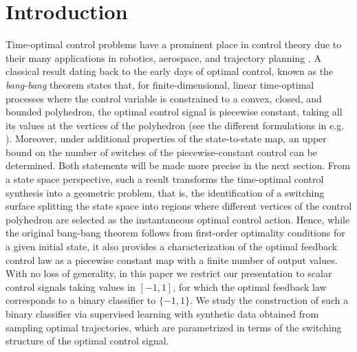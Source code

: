 \documentclass[11pt]{amsart}
\theoremstyle{definition}
\theoremstyle{remark}
\numberwithin{equation}{section}
\begin{document}
\section{Introduction}
Time-optimal control problems have a prominent place in control theory due to their many applications in robotics, aerospace, and trajectory planning \cite{TOCP,TOCR,TOCC}. A classical result dating back to the early days of optimal control, known as the \textsl{bang-bang} theorem states that, for finite-dimensional, linear time-optimal processes where the control variable is constrained to a convex, closed, and bounded polyhedron, the optimal control signal is piecewise constant, taking all its values at the vertices of the polyhedron (see the different formulations  in e.g. \cite{BellmanBB,LaSalle,PMP}). Moreover, under additional properties of the state-to-state map, an upper bound on the number of switches of the piecewise-constant control can be determined. Both statements will be made more precise in the next section. From a state space perspective, such a result transforms the time-optimal control synthesis into a geometric problem, that is, the identification of a switching surface splitting the state space into regions where different vertices of the control polyhedron are selected as the instantaneous optimal control action. Hence, while the original bang-bang theorem follows from first-order optimality conditions for a given initial state, it also provides a characterization of the optimal feedback control law as a piecewise constant map with a finite number of output values. With no loss of generality, in this paper we restrict our presentation to scalar control signals taking values in $[-1,1]$, for which the optimal feedback law corresponds to a binary classifier to $\{-1,1\}$. We study the construction of such a binary classifier via supervised learning with synthetic data obtained from sampling optimal trajectories, which are parametrized in terms of the switching structure of the optimal control signal.
\end{document}
